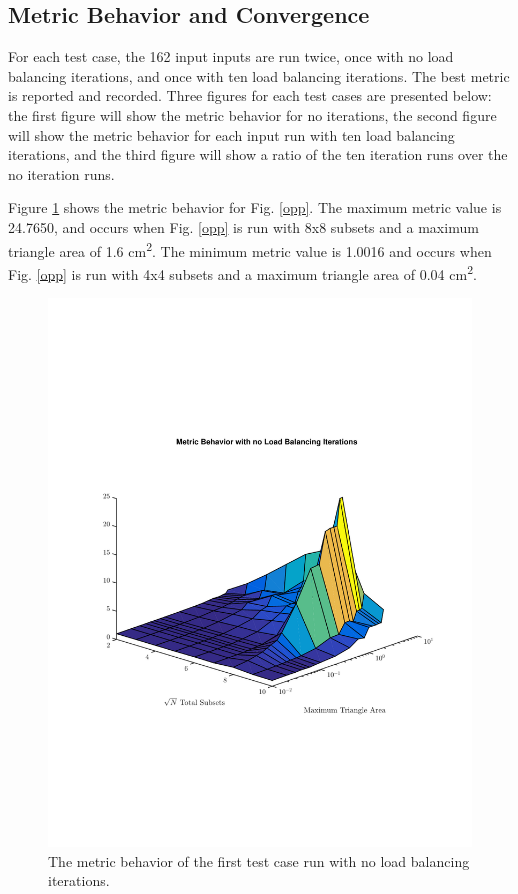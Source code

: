 \documentclass{anstrans}
\begin{document}
\subsection{Metric Behavior and Convergence}

For each test case, the 162 input inputs are run twice, once with no load balancing iterations, and once with ten load balancing iterations. The best metric is reported and recorded. Three figures for each test cases are presented below: the first figure will show the metric behavior for no iterations, the second figure will show the metric behavior for each input run with ten load balancing iterations, and the third figure will show a ratio of the ten iteration runs over the no iteration runs.

Figure \ref{oppnoiter} shows the metric behavior for Fig. \ref{opp}. The maximum metric value is 24.7650, and occurs when Fig. \ref{opp} is run with 8x8 subsets and a maximum triangle area of 1.6 cm\textsuperscript{2}. The minimum metric value is 1.0016 and occurs when Fig. \ref{opp} is run with 4x4 subsets and a maximum triangle area of 0.04 cm\textsuperscript{2}. 

\begin{figure}[H]
\centering
\includegraphics[scale=0.5, trim = 0cm 8cm 0cm 7cm,clip]{figures/OppNoIter.pdf}
\caption{The metric behavior of the first test case run with no load balancing iterations.}
\label{oppnoiter}
\end{figure}
\end{document}
